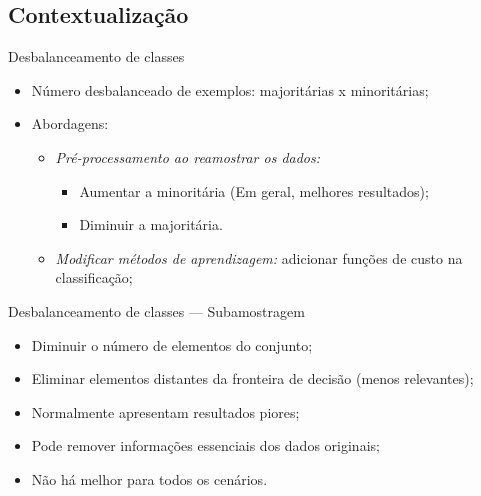 \documentclass{beamer}
\begin{document}
\subsection{Contextualização}
\begin{frame}{Desbalanceamento de classes}
  \setlength\leftmargini{1em}
  \justifying
  \begin{itemize}
    \item Número desbalanceado de exemplos: majoritárias x minoritárias;
    \item Abordagens:
    \begin{itemize}
      \item \emph{Pré-processamento ao reamostrar os dados:}
      \begin{itemize}
        \item Aumentar a minoritária (Em geral, melhores resultados);
        \item Diminuir a majoritária.
      \end{itemize}
      \item \emph{Modificar métodos de aprendizagem:} adicionar funções de custo na classificação;
    \end{itemize}
  \end{itemize}
\end{frame}
\begin{frame}{Desbalanceamento de classes --- Subamostragem}
  \setlength\leftmargini{1em}
  \justifying
  \begin{itemize}
    \item Diminuir o número de elementos do conjunto;
    \item Eliminar elementos distantes da fronteira de decisão (menos relevantes);
    \item Normalmente apresentam resultados piores;
    \item Pode remover informações essenciais dos dados originais;
    \item Não há melhor para todos os cenários.
  \end{itemize}
\end{frame}
\end{document}
